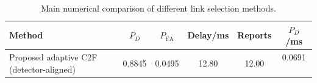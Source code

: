 \begin{table}[t]
    \centering
    \caption{Main numerical comparison of different link selection methods.}
    \label{tab:main_summary}
    \begin{tabular}{l c c c c c}
        \hline
        Method & $P_D$ & $P_{\mathrm{FA}}$ & Delay/ms & Reports & $P_D$/ms \\
        \hline
        Proposed adaptive C2F (detector-aligned) & 0.8845 & 0.0495 & 12.80 & 12.00 & 0.0691 \
        \hline
    \end{tabular}
\end{table}
